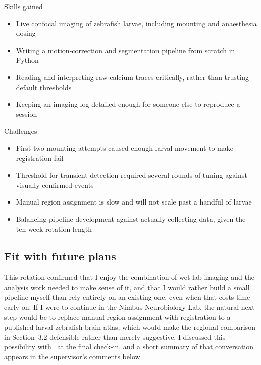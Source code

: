 \begin{minipage}[t]{0.48\textwidth}
\begin{infopanel}{Skills gained}
\begin{itemize}[leftmargin=1.2em, itemsep=0.2em]
  \item Live confocal imaging of zebrafish larvae, including mounting and
    anaesthesia dosing
  \item Writing a motion-correction and segmentation pipeline from scratch in Python
  \item Reading and interpreting raw calcium traces critically, rather than trusting
    default thresholds
  \item Keeping an imaging log detailed enough for someone else to reproduce a session
\end{itemize}
\end{infopanel}
\end{minipage}
\hfill
\begin{minipage}[t]{0.48\textwidth}
\begin{infopanel}{Challenges}
\begin{itemize}[leftmargin=1.2em, itemsep=0.2em]
  \item First two mounting attempts caused enough larval movement to make
    registration fail
  \item Threshold for transient detection required several rounds of tuning against
    visually confirmed events
  \item Manual region assignment is slow and will not scale past a handful of larvae
  \item Balancing pipeline development against actually collecting data, given the
    ten-week rotation length
\end{itemize}
\end{infopanel}
\end{minipage}
\par

\subsection{Fit with future plans}

This rotation confirmed that I enjoy the combination of wet-lab imaging and the
analysis work needed to make sense of it, and that I would rather build a small
pipeline myself than rely entirely on an existing one, even when that costs time
early on. If I were to continue in the Nimbus Neurobiology Lab, the natural next step
would be to replace manual region assignment with registration to a published larval
zebrafish brain atlas, which would make the regional comparison in
Section~3.2 defensible rather than merely suggestive. I discussed this
possibility with \reportsupervisor\ at the final check-in, and a short summary of that
conversation appears in the supervisor's comments below.
